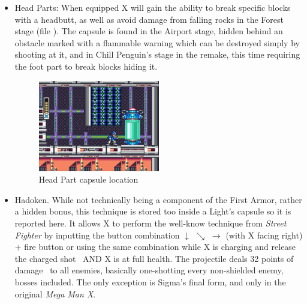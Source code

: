 \begin{itemize}
	
	\item Head Parts: When equipped X will gain the ability to break specific blocks with a headbutt, as well as avoid damage from falling rocks in the Forest stage (file ). The capsule is found in the Airport stage, hidden behind an obstacle marked with a flammable warning which can be destroyed simply by shooting at it, and in Chill Penguin's stage in the remake, this time requiring the foot part to break blocks hiding it.
	\begin{figure}[htp]
		\centering
		\includegraphics[width=0.5\textwidth]{figures/X1/Storm_eagle/Storm_armor_2.jpg}
		\caption{Head Part capsule location}
	\end{figure}
	
	\item Hadoken. While not technically being a component of the First Armor, rather a hidden bonus, this technique is stored too inside a Light's capsule so it is reported here. It allows X to perform the well-know technique from \textit{Street Fighter} by inputting the button combination $\downarrow$ $\searrow$ $\rightarrow$ (with X facing right) + fire button or using the same combination while X is charging and release the charged shot~\cite{RTA_wiki:X1}  AND X is at full health. The projectile deals 32 points of damage~\cite{wiki:Hadoken} to all enemies, basically one-shotting every non-shielded enemy, bosses included. The only exception is Sigma's final form, and only in the original \textit{Mega Man X}. 
	

\end{itemize}

